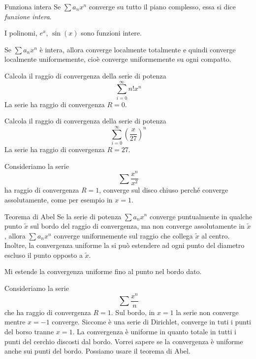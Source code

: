 \documentclass[a4paper]{article}
\begin{document}
\begin{snippetdefinition}{Funziona intera}
    Se \(\sum a_nx^n\) converge su tutto il piano complesso, essa si dice
    \emph{funzione intera}.
\end{snippetdefinition}

\begin{snippetexample}{}
    I polinomi, \(e^x\), \(\sin(x)\) sono funzioni intere.
\end{snippetexample}

Se \(\sum a_nx^n\) è intera, allora converge localmente totalmente e quindi
converge localmente uniformemente, cioè converge uniformemente su ogni compatto.

\begin{snippetexample}{}
    Calcola il raggio di convergenza della serie di potenza
    \[
        \sum_{i=0}^\infty n!x^n
    \]
    La serie ha raggio di convergenza \(R=0\).
\end{snippetexample}

\begin{snippetexample}{}
    Calcola il raggio di convergenza della serie di potenza
    \[
        \sum_{i=0}^\infty \left(
            \frac{x}{27}
        \right)^n
    \]
    La serie ha raggio di convergenza \(R=27\).
\end{snippetexample}

\begin{snippetexample}{}
    Consideriamo la serie
    \[
        \sum \frac{x^n}{x^2}
    \]
    ha raggio di convergenza \(R=1\),
    converge sul disco chiuso perché converge assolutamente, come per esempio in \(x=1\).
\end{snippetexample}

\begin{snippettheorem}{Teorema di Abel}
    Se la serie di potenza \(\sum a_nx^n\) converge puntualmente
    in qualche punto \(\tilde x\) sul bordo del raggio di convergenza,
    ma non converge assolutamente in \(\tilde x\),
    allora \(\sum a_nx^n\) converge uniformemente
    sul raggio che collega \(\tilde x\) al centro.
    Inoltre, la convergenza uniforme la si può estendere ad ogni punto
    del diametro escluso il punto opposto a \(\tilde x\).
\end{snippettheorem}

Mi estende la convergenza uniforme fino al punto nel bordo dato.

\begin{snippetexample}{}
    Consideriamo la serie
    \[
        \sum \frac{x^n}{n}
    \]
    che ha raggio di convergenza \(R=1\).
    Sul bordo, in \(x=1\) la serie non converge mentre \(x=-1\) converge.
    Siccome è una serie di Dirichlet, converge in tuti i punti del borso tranne \(x=1\).
    La convergenza è uniforme in quanto totale in tutti i punti del cerchio discosti dal bordo.
    Vorrei sapere se la convergenza è uniforme
    anche sui punti del bordo. Possiamo usare il teorema di Abel.
\end{snippetexample}
\end{document}
